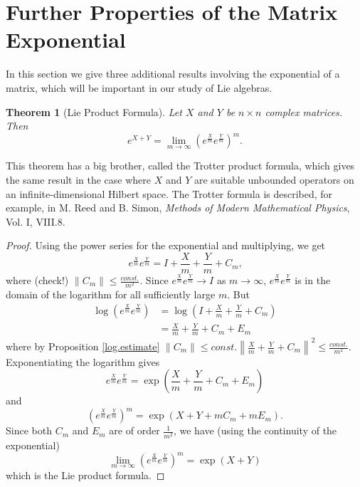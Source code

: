 \documentclass[12pt]{amsbook}
\theoremstyle{plain}
\newtheorem{theorem}{Theorem}
\numberwithin{equation}{chapter}
\numberwithin{theorem}{chapter}
\begin{document}
\section{Further Properties of the Matrix Exponential\label{further}}

In this section we give three additional results involving the exponential of
a matrix, which will be important in our study of Lie algebras.

\begin{theorem}
[Lie Product Formula]Let $X$ and $Y$ be $n\times n$ complex matrices. Then
\[
e^{X+Y}=\lim_{m\rightarrow\infty}\left(  e^{\frac{X}{m}}e^{\frac{Y}{m}%
}\right)  ^{m}\text{.}%
\]
\end{theorem}

This theorem has a big brother, called the Trotter product formula, which
gives the same result in the case where $X$ and $Y$ are suitable unbounded
operators on an infinite-dimensional Hilbert space. The Trotter formula is
described, for example, in M. Reed and B. Simon, \textit{Methods of Modern
Mathematical Physics}, Vol. I, VIII.8.

\begin{proof}
Using the power series for the exponential and multiplying, we get
\[
e^{\frac{X}{m}}e^{\frac{Y}{m}}=I+\frac{X}{m}+\frac{Y}{m}+C_{m}\text{,}%
\]
where (check!) $\left\|  C_{m}\right\|  \leq\frac{const.}{m^{2}}$. Since
$e^{\frac{X}{m}}e^{\frac{Y}{m}}\rightarrow I$ as $m\rightarrow\infty$,
$e^{\frac{X}{m}}e^{\frac{Y}{m}}$ is in the domain of the logarithm for all
sufficiently large $m$. But
\begin{align*}
\log\left(  e^{\frac{X}{m}}e^{\frac{Y}{m}}\right)    & =\log\left(  I+\frac
{X}{m}+\frac{Y}{m}+C_{m}\right)  \\
& =\frac{X}{m}+\frac{Y}{m}+C_{m}+E_{m}%
\end{align*}
where by Proposition \ref{log.estimate} $\left\|  C_{m}\right\|  \leq
const.\left\|  \frac{X}{m}+\frac{Y}{m}+C_{m}\right\|  ^{2}\leq\frac
{const.}{m^{2}}$. Exponentiating the logarithm gives
\[
e^{\frac{X}{m}}e^{\frac{Y}{m}}=\exp\left(  \frac{X}{m}+\frac{Y}{m}+C_{m}%
+E_{m}\right)
\]
and
\[
\left(  e^{\frac{X}{m}}e^{\frac{Y}{m}}\right)  ^{m}=\exp\left(  X+Y+mC_{m}%
+mE_{m}\right)  \text{.}%
\]
Since both $C_{m}$ and $E_{m}$ are of order $\frac{1}{m^{2}}$, we have (using
the continuity of the exponential)
\[
\lim_{m\rightarrow\infty}\left(  e^{\frac{X}{m}}e^{\frac{Y}{m}}\right)
^{m}=\exp\left(  X+Y\right)
\]
which is the Lie product formula.
\end{proof}
\end{document}
